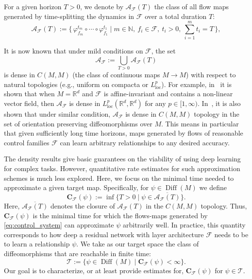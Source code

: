 \documentclass[12pt]{amsart}
\numberwithin{equation}{section}
\theoremstyle{remark}
\begin{document}
For a given horizon $T>0$, we denote by $\mathcal A_{\mathcal F}(T)$ the class of all flow maps generated by time-splitting the dynamics in $\mathcal F$ over
a total duration $T$:
\begin{equation}
        \mathcal A_{\mathcal F}(T):=\big\{\,\varphi_{f_m}^{t_m}\circ \cdots\circ \varphi_{f_1}^{t_1}\;\big|\; m\in\mathbb N,\ f_i\in\mathcal F,\ t_i>0,\ \sum_{i=1}^m t_i = T\,\big\},
\end{equation}

It is now known that under mild conditions on $\mathcal F$, the set
\begin{equation}
    \mathcal A_{\mathcal F}:=\bigcup_{T>0} \mathcal A_{\mathcal F}(T)
\end{equation}
is dense in $C(M,M)$ (the class of continuous maps $M\to M$)
with respect to natural topologies (e.g., uniform on compacta or $L^p_{\operatorname{loc}}$).
For example, in~\cite{li2022deep,tabuada2022universal,ruiz2023neural,agrachev2022control, cheng2025interpolation} it is shown that when $M=\mathbb R^{d}$ and $\mathcal F$ is affine-invariant and contains a non-linear vector field, then $\mathcal A_{\mathcal F}$ is dense in $L_{\operatorname{loc}}^p(\mathbb R^d, \mathbb R^d)$ for any $p\in[1,\infty)$.
In~\cite{duan2025minimal}, it is also shown that under similar condition,
$\mathcal A_{\mathcal F}$ is dense in $C(M,M)$ topology in the set of orientation preserving diffeomorphisms over $M$.
This means in particular that given sufficiently long time horizons,
maps generated by flows of reasonable control families $\mathcal F$ can
learn arbitrary relationships to any desired accuracy.

The density results give basic guarantees on the viability of using
deep learning for complex tasks.
However, quantitative rate estimates for such approximation schemes is much less explored.
Here, we focus on the minimal time needed to approximate a given target map.
Specifically, for $\psi\in \operatorname{Diff}(M)$ we define
\begin{equation}
    \label{eq:complexity_def}
    \mathbf C_{\mathcal F}(\psi):=\inf\{T>0\mid \psi\in \overline{\mathcal A_{\mathcal F}(T)}\}.
\end{equation}
Here, $\overline{\mathcal A_{\mathcal F}(T)}$ denotes the closure of $\mathcal A_{\mathcal F}(T)$ in the $C(M,M)$ topology.
Thus, $\mathbf C_{\mathcal F}(\psi)$ is the minimal time for which the flows-maps
generated by \eqref{eq:control_system} can approximate $\psi$ arbitrarily well.
In practice, this quantity corresponds to how deep a residual network with
layer architecture $\mathcal F$ needs to be to learn a relationship $\psi$.
We take as our target space the class of diffeomorphisms that are reachable in finite time:
\begin{equation}
    \label{eq:target_space}
    \mathcal T :=\{\psi\in \operatorname{Diff}(M)\mid \mathbf C_{\mathcal F}(\psi)<\infty\}.
\end{equation}
Our goal is to characterize, or at least provide estimates for, $\mathbf C_{\mathcal F}(\psi)$ for $\psi\in \mathcal T$.
\end{document}
